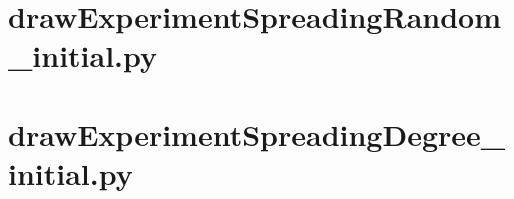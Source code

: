 \documentclass{article}
\begin{document}
\section{drawExperimentSpreadingRandom\_initial.py}


\section{drawExperimentSpreadingDegree\_initial.py}

\end{document}

